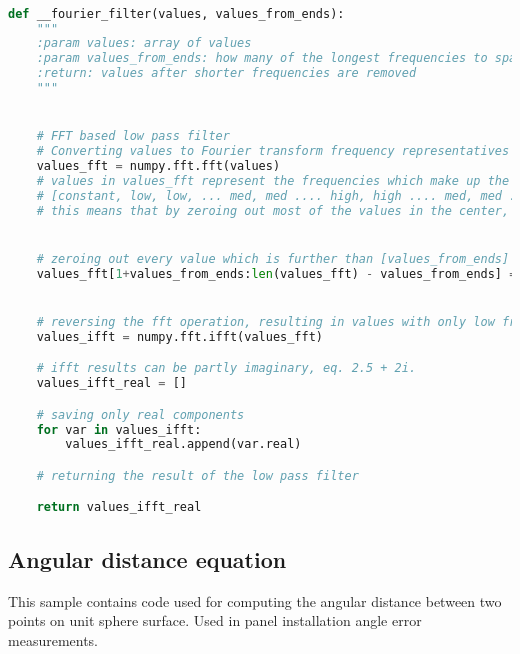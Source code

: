\begin{lstlisting}[language=Python, caption={Cloud free day finder low pass filter}]

def __fourier_filter(values, values_from_ends):
    """
    :param values: array of values
    :param values_from_ends: how many of the longest frequencies to spare
    :return: values after shorter frequencies are removed
    """


    # FFT based low pass filter
    # Converting values to Fourier transform frequency representatives
    values_fft = numpy.fft.fft(values)
    # values in values_fft represent the frequencies which make up the values array. Structure is as follows:
    # [constant, low, low, ... med, med .... high, high .... med, med .... low,low]
    # this means that by zeroing out most of the values in the center, only the low frequency parts can be chosen.


    # zeroing out every value which is further than [values_from_ends] from the ends of the values_fft array
    values_fft[1+values_from_ends:len(values_fft) - values_from_ends] = [0] * (len(values_fft)-1 - 2 * values_from_ends)


    # reversing the fft operation, resulting in values with only low frequency components
    values_ifft = numpy.fft.ifft(values_fft)

    # ifft results can be partly imaginary, eq. 2.5 + 2i.
    values_ifft_real = []

    # saving only real components
    for var in values_ifft:
        values_ifft_real.append(var.real)

    # returning the result of the low pass filter

    return values_ifft_real
\end{lstlisting}


\subsection{Angular distance equation} \label{angular_distace_appendix}
This sample contains code used for computing the angular distance between two points on unit sphere surface. Used in panel installation angle error measurements.

